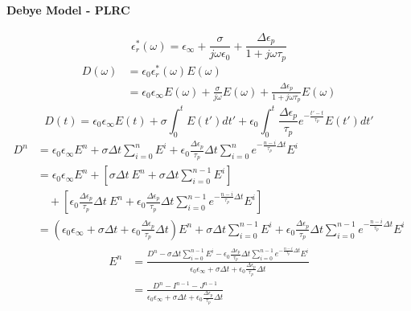 \paragraph{{\msjh Debye Model - PLRC}}
\begin{displaymath}
  \epsilon_r^*(\omega) = \epsilon_{\infty} + \frac{\sigma}{j\omega \epsilon_0} + \frac{\Delta \epsilon_p}{1+j\omega \tau_p}
\end{displaymath}
\begin{displaymath}
  \begin{split}
    D(\omega) & = \epsilon_0 \epsilon_r^*(\omega) E(\omega)\\
    & = \epsilon_0 \epsilon_{\infty} E(\omega) + \frac{\sigma}{j\omega} E(\omega) + \frac{\Delta \epsilon_p}{1+j\omega \tau_p}E(\omega)
  \end{split}
\end{displaymath}
\begin{displaymath}
  D(t) = \epsilon_0 \epsilon_{\infty} E(t) + \sigma \int_0^t E(t')dt' + \epsilon_0 \int_0^t \frac{\Delta \epsilon_p}{\tau_p}e^{-\frac{t'-t}{\tau_p}}E(t')dt'
\end{displaymath}
\begin{displaymath}
  \begin{split}
    D^n & = \epsilon_0 \epsilon_{\infty}E^n + \sigma \Delta t \sum_{i=0}^{n}E^i + \epsilon_0 \frac{\Delta \epsilon_p}{\tau_p}\Delta t \sum_{i=0}^{n} e^{-\frac{n-i}{\tau_p}\Delta t} E^i\\
    & = \epsilon_0 \epsilon_{\infty} E^n + \left[\sigma \Delta t\ E^n + \sigma \Delta t \sum_{i=0}^{n-1}E^i\right]\\
    &\quad + \left[\epsilon_0 \frac{\Delta \epsilon_p}{\tau_p}\Delta t\ E^n + \epsilon_0 \frac{\Delta \epsilon_p}{\tau_p} \Delta t \sum_{i=0}^{n-1}e^{-\frac{n-i}{\tau_p}\Delta t}E^i\right]\\
    & = \left(\epsilon_0 \epsilon_{\infty} + \sigma \Delta t + \epsilon_0 \frac{\Delta \epsilon_p}{\tau_p} \Delta t\right)E^n + \sigma \Delta t \sum_{i=0}^{n-1}E^i + \epsilon_0 \frac{\Delta \epsilon_p}{\tau_p}\Delta t \sum_{i=0}^{n-1}e^{-\frac{n-i}{\tau_p}\Delta t}E^i
  \end{split}
\end{displaymath}
\begin{displaymath}
  \begin{split}
    E^n & = \frac{\displaystyle D^n - \sigma \Delta t \sum_{i=0}^{n-1}E^i - \epsilon_0 \frac{\Delta \epsilon_p}{\tau_p}\Delta t \sum_{i=0}^{n-1}e^{-\frac{n-i}{\tau_p}\Delta t}E^i }{\displaystyle\epsilon_0 \epsilon_{\infty} + \sigma \Delta t + \epsilon_0 \frac{\Delta \epsilon_p}{\tau_p} \Delta t}\\
    & = \frac{\displaystyle D^n - I^{n-1} - J^{n-1} }{\displaystyle\epsilon_0 \epsilon_{\infty} + \sigma \Delta t + \epsilon_0 \frac{\Delta \epsilon_p}{\tau_p} \Delta t}\\
  \end{split}
\end{displaymath}





